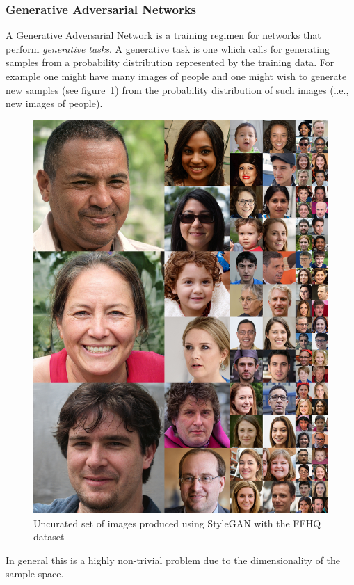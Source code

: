 \subsubsection{Generative Adversarial Networks}
A Generative Adversarial Network\cite{goodfellow2014generative} is a training regimen for networks that perform \textit{generative tasks}.
%
A generative task is one which calls for generating samples from a probability distribution represented by the training data.
%
For example one might have many images of people and one might wish to generate new samples (see figure~\ref{fig:stylegan}) from the probability distribution of such images (i.e., new images of people).
\begin{figure}
    \centering
    \begin{adjustbox}{width=.8\linewidth}
        \centering
        \includegraphics[]{figures/neural_networks/stylegan.jpg}
    \end{adjustbox}
    \caption{Uncurated set of images produced using StyleGAN with the FFHQ dataset\cite{karras2018stylebased}}\label{fig:stylegan}
\end{figure}
%
In general this is a highly non-trivial problem due to the dimensionality of the sample space.


